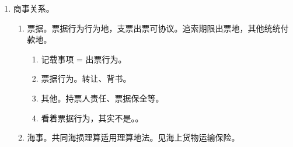 \begin{enumerate}
\begin{enumerate}
\begin{kk}{例外}
\begin{enumerate}
                          \begin{enumerate}
                            \item 内容归属保护地，转让许可是协议。。
                            \item 侵权法院保护地。。
                            \item 侵权后允许合意但只能选法院地法 \yjt 不选 \yjt （分别）适用被请求保护地法。
                                  。
                          \end{enumerate}
                  \end{enumerate}
                \end{kk}
          \item 不当得利、无因管理之债。不当管理是一对，自治共居发生地。
        \end{enumerate}
  \item 商事关系。
        \begin{enumerate}
          \item 票据。票据行为行为地，支票出票可协议。追索期限出票地，其他统统付款地。
                \begin{enumerate}
                  \item 记载事项 = 出票行为。
                  \item 票据行为。转让、背书。
                  \item 其他。持票人责任、票据保全等。
                  \item 看着票据行为，其实不是。。
                \end{enumerate}
          \item 海事。共同海损理算适用理算地法。见海上货物运输保险。
        \end{enumerate}
\end{enumerate}
